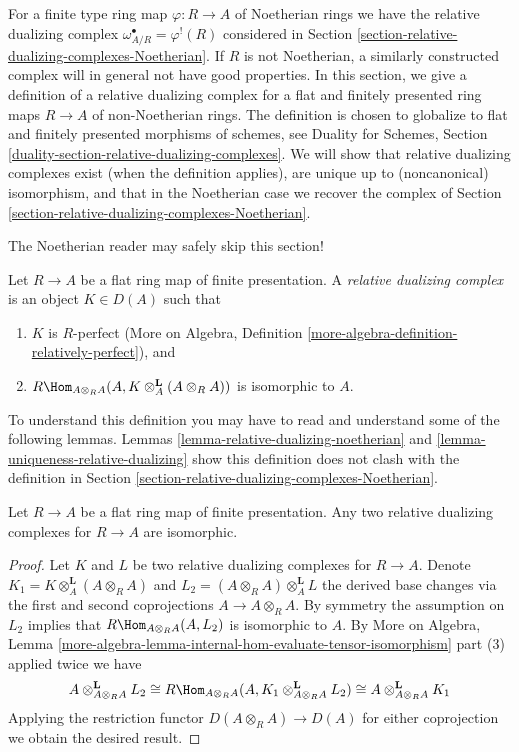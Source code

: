 \noindent
For a finite type ring map $\varphi : R \to A$ of Noetherian rings
we have the relative dualizing complex $\omega_{A/R}^\bullet = \varphi^!(R)$
considered in Section \ref{section-relative-dualizing-complexes-Noetherian}.
If $R$ is not Noetherian, a similarly constructed complex will
in general not have good properties. In this section, we give a
definition of a relative dualizing complex for a flat and finitely presented
ring maps $R \to A$ of non-Noetherian rings. The definition is
chosen to globalize to flat and finitely presented morphisms
of schemes, see Duality for Schemes, Section
\ref{duality-section-relative-dualizing-complexes}. We will
show that relative dualizing complexes exist (when the definition
applies), are unique up to (noncanonical) isomorphism,
and that in the Noetherian case we recover the complex of
Section \ref{section-relative-dualizing-complexes-Noetherian}.

\medskip\noindent
The Noetherian reader may safely skip this section!

\begin{definition}
\label{definition-relative-dualizing-complex}
Let $R \to A$ be a flat ring map of finite presentation.
A {\it relative dualizing complex} is an object $K \in D(A)$ such that
\begin{enumerate}
\item $K$ is $R$-perfect (More on Algebra, Definition
\ref{more-algebra-definition-relatively-perfect}), and
\item $R\Hom_{A \otimes_R A}(A, K \otimes_A^\mathbf{L} (A \otimes_R A))$
is isomorphic to $A$.
\end{enumerate}
\end{definition}

\noindent
To understand this definition you may have to read and understand some
of the following lemmas. Lemmas \ref{lemma-relative-dualizing-noetherian} and
\ref{lemma-uniqueness-relative-dualizing} show this definition
does not clash with the definition in
Section \ref{section-relative-dualizing-complexes-Noetherian}.

\begin{lemma}
\label{lemma-uniqueness-relative-dualizing}
Let $R \to A$ be a flat ring map of finite presentation.
Any two relative dualizing complexes for $R \to A$ are isomorphic.
\end{lemma}

\begin{proof}
Let $K$ and $L$ be two relative dualizing complexes for $R \to A$.
Denote $K_1 = K \otimes_A^\mathbf{L} (A \otimes_R A)$
and $L_2 = (A \otimes_R A) \otimes_A^\mathbf{L} L$ the
derived base changes via the first and second coprojections
$A \to A \otimes_R A$. By symmetry the assumption on $L_2$
implies that $R\Hom_{A \otimes_R A}(A, L_2)$ is isomorphic to $A$.
By More on Algebra, Lemma
\ref{more-algebra-lemma-internal-hom-evaluate-tensor-isomorphism} part (3)
applied twice we have
$$
A \otimes_{A \otimes_R A}^\mathbf{L} L_2 \cong
R\Hom_{A \otimes_R A}(A, K_1 \otimes_{A \otimes_R A}^\mathbf{L} L_2) \cong
A \otimes_{A \otimes_R A}^\mathbf{L} K_1
$$
Applying the restriction functor $D(A \otimes_R A) \to D(A)$
for either coprojection we obtain the desired result.
\end{proof}

